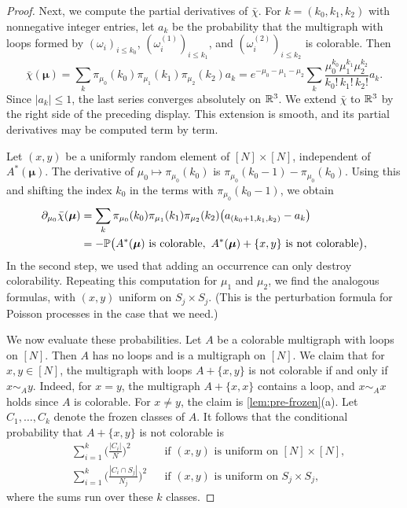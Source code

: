 \begin{proof}
Next, we compute the partial derivatives of $\bar\chi$. For $k = (k_0, k_1, k_2)$ with nonnegative integer entries, let $a_k$ be the probability that the multigraph with loops formed by $(\omega_i)_{i \le k_0}$, $(\omega^{(1)}_i)_{i \le k_1}$, and $(\omega^{(2)}_i)_{i \le k_2}$ is colorable. Then
\[
\bar\chi(\boldsymbol\mu) = \sum_{k} \pi_{\mu_0}(k_0) \pi_{\mu_1}(k_1) \pi_{\mu_2}(k_2) a_k = e^{-\mu_0 - \mu_1 - \mu_2} \sum_{k} \frac{\mu_0^{k_0} \mu_1^{k_1} \mu_2^{k_2}}{k_0! \, k_1! \, k_2!} a_k.
\]
Since $|a_k| \le 1$, the last series converges absolutely on $\mathbb R^3$. We extend $\bar\chi$ to $\mathbb R^3$ by the right side of the preceding display. This extension is smooth, and its partial derivatives may be computed term by term.

Let $(x, y)$ be a uniformly random element of $[N] \times [N]$, independent of $A^*(\boldsymbol\mu)$. The derivative of $\mu_0 \mapsto \pi_{\mu_0}(k_0)$ is $\pi_{\mu_0}(k_0 - 1) - \pi_{\mu_0}(k_0)$. Using this and shifting the index $k_0$ in the terms with $\pi_{\mu_0}(k_0 - 1)$, we obtain
\[
\begin{aligned}
\partial_{\mu_0} \bar\chi(\boldsymbol\mu) &= \sum_{k} \pi_{\mu_0}(k_0) \pi_{\mu_1}(k_1) \pi_{\mu_2}(k_2) \big(a_{(k_0 + 1, k_1, k_2)} - a_k\big)\\
&= -\Pp\big(A^*(\boldsymbol\mu) \text{ is colorable}, \ A^*(\boldsymbol\mu) + \{x, y\} \text{ is not colorable}\big),
\end{aligned}
\]
In the second step, we used that adding an occurrence can only destroy colorability. Repeating this computation for $\mu_1$ and $\mu_2$, we find the analogous formulas, with $(x, y)$ uniform on $S_j \times S_j$. (This is the perturbation formula for Poisson processes \cite[Theorem~19.1]{last2018lectures} in the case that we need.)

We now evaluate these probabilities. Let $A$ be a colorable multigraph with loops on $[N]$. Then $A$ has no loops and is a multigraph on $[N]$. We claim that for $x, y \in [N]$, the multigraph with loops $A + \{x, y\}$ is not colorable if and only if $x \sim _A y$. Indeed, for $x = y$, the multigraph $A + \{x, x\}$ contains a loop, and $x \sim _A x$ holds since $A$ is colorable. For $x \neq y$, the claim is \cref{lem:pre-frozen}(a). Let $C_1, \dots, C_k$ denote the frozen classes of $A$. It follows that the conditional probability that $A + \{x, y\}$ is not colorable is
\[
\begin{aligned}
&\sum_{i = 1}^k \Big(\frac{|C_i|}{N}\Big)^2 &&\text{if } (x, y) \text{ is uniform on } [N] \times [N], \\
&\sum_{i = 1}^k \Big(\frac{|C_i \cap S_j|}{N_j}\Big)^2 &&\text{if } (x, y) \text{ is uniform on } S_j \times S_j,
\end{aligned}
\]
where the sums run over these $k$ classes.


\end{proof}
